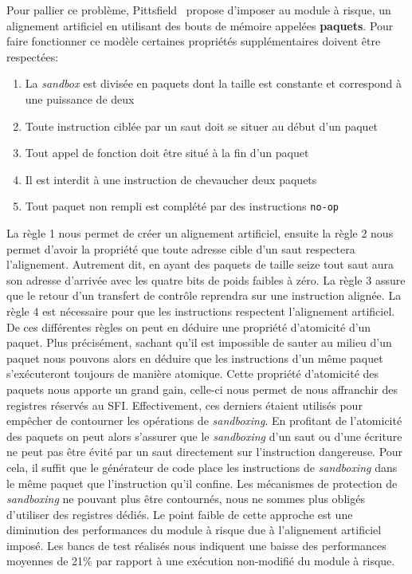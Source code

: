 \documentclass[11pt]{sdm}
\begin{document}
	Pour pallier ce problème, Pittsfield~\cite{Mccamant_evaluatingsfi} propose d'imposer au module à risque, un alignement artificiel en utilisant des bouts de mémoire appelées \textbf{paquets}.
Pour faire fonctionner ce modèle certaines propriétés supplémentaires doivent être respectées:
\begin{enumerate}
	\item La \textit{sandbox} est divisée en paquets dont la taille est constante et correspond à une puissance de deux
	\item Toute instruction ciblée par un saut doit se situer au début d'un paquet
	\item Tout appel de fonction doit être situé à la fin d'un paquet
	\item Il est interdit à une instruction de chevaucher deux paquets
	\item Tout paquet non rempli est complété par des instructions \texttt{no-op}
\end{enumerate}		
	
	La règle 1 nous permet de créer un alignement artificiel, ensuite la règle 2 nous permet d'avoir la propriété que toute adresse cible d'un saut respectera l'alignement. Autrement dit, en ayant des paquets de taille seize tout saut aura son adresse d'arrivée avec les quatre bits de poids faibles à zéro.
	La règle 3 assure que le retour d'un transfert de contrôle reprendra sur une instruction alignée. La règle 4 est nécessaire pour que les instructions respectent l'alignement artificiel. De ces différentes règles on peut en déduire une propriété d'atomicité d'un paquet. Plus précisément, sachant qu'il est impossible de sauter au milieu d'un paquet nous pouvons alors en déduire que les instructions d'un même paquet s'exécuteront toujours de manière atomique.
	Cette propriété d'atomicité des paquets nous apporte un grand gain, celle-ci nous permet de nous affranchir des registres réservés au SFI. Effectivement, ces derniers étaient utilisés pour empêcher de contourner les opérations de \textit{sandboxing}. En profitant de l'atomicité des paquets on peut alors s'assurer que le \textit{sandboxing} d'un saut ou d'une écriture ne peut pas être évité par un saut directement sur l'instruction dangereuse. Pour cela, il suffit que le générateur de code place les instructions de \textit{sandboxing} dans le même paquet que l'instruction qu'il confine. Les mécanismes de protection de \textit{sandboxing} ne pouvant plus être contournés, nous ne sommes plus obligés d'utiliser des registres dédiés. 
	Le point faible de cette approche est une diminution des performances du module à risque due à l'alignement artificiel imposé. Les bancs de test réalisés nous indiquent une baisse des performances moyennes de 21\% par rapport à une exécution non-modifié du module à risque.
\end{document}
